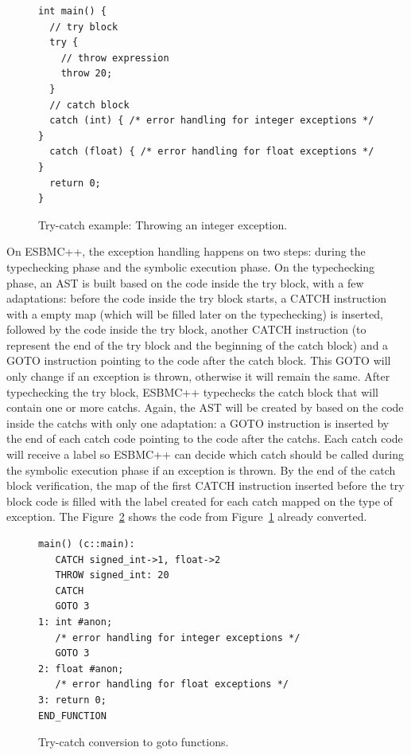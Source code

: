 \documentclass[a4paper]{llncs}
\begin{document}
\begin{figure}[ht]
\centering
\begin{minipage}{1.0\textwidth}
\begin{lstlisting}
int main() {
  // try block
  try {
    // throw expression
    throw 20;
  }
  // catch block
  catch (int) { /* error handling for integer exceptions */ }
  catch (float) { /* error handling for float exceptions */ }
  return 0;
}
\end{lstlisting}
\end{minipage}
\caption{Try-catch example: Throwing an integer exception.}
\label{figure:try-catch-example}
\end{figure}

On ESBMC++, the exception handling happens on two steps:
during the typechecking phase and the symbolic execution phase.
On the typechecking phase, an AST is built based on the code
inside the try block, with a few adaptations: before the code
inside the try block starts, a CATCH instruction with a empty map
(which will be filled later on the typechecking) is inserted, followed by
the code inside the try block, another CATCH instruction
(to represent the end of the try block and the beginning of the
catch block) and a GOTO instruction pointing to the code after
the catch block. This GOTO will only change if an exception is thrown,
otherwise it will remain the same. After typechecking the try block,
ESBMC++ typechecks the catch block that will contain one or more catchs.
Again, the AST will be created by based on the code inside the catchs
with only one adaptation: a GOTO instruction is inserted by the end of
each catch code pointing to the code after the catchs. Each catch code
will receive a label so ESBMC++ can decide which catch should be called
during the symbolic execution phase if an exception is thrown. By the end
of the catch block verification, the map of the first CATCH instruction
inserted before the try block code is filled with the label created
for each catch mapped on the type of exception. The Figure~\ref{figure:try-catch-goto}
shows the code from Figure~\ref{figure:try-catch-example} already converted.

\begin{figure}[ht]
\centering
\begin{minipage}{1.0\textwidth}
\begin{lstlisting}
main() (c::main):
   CATCH signed_int->1, float->2
   THROW signed_int: 20
   CATCH
   GOTO 3
1: int #anon;
   /* error handling for integer exceptions */
   GOTO 3
2: float #anon;
   /* error handling for float exceptions */
3: return 0;
END_FUNCTION
\end{lstlisting}
\end{minipage}
\caption{Try-catch conversion to goto functions.}
\label{figure:try-catch-goto}
\end{figure}
\end{document}
